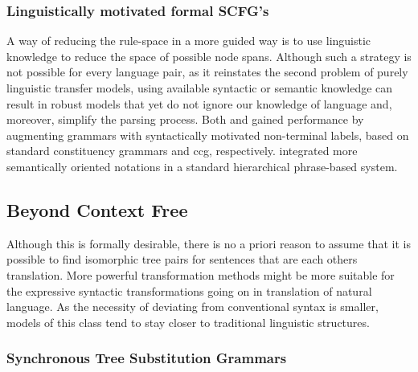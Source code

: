 \documentclass{report}
\theoremstyle{definition}
\theoremstyle{plain}
\begin{document}

\subsubsection{Linguistically motivated formal SCFG's}

A way of reducing the rule-space in a more guided way is to use linguistic knowledge to reduce the space of possible node spans. Although such a strategy is not possible for every language pair, as it reinstates the second problem of purely linguistic transfer models, using available syntactic or semantic knowledge can result in robust models that yet do not ignore our knowledge of language and, moreover, simplify the parsing process. Both \cite{zollmann2006syntax} and \cite{almaghout2010ccg} gained performance by augmenting grammars with syntactically motivated non-terminal labels, based on standard constituency grammars and ccg, respectively. \cite{li2013modeling} integrated more semantically oriented notations in a standard hierarchical phrase-based system.


\subsection{Beyond Context Free}

Although this is formally desirable, there is no a priori reason to assume that it is possible to find isomorphic tree pairs for sentences that are each others translation. More powerful transformation methods might be more suitable for the expressive syntactic transformations going on in translation of natural language. As the necessity of deviating from conventional syntax is smaller, models of this class tend to stay closer to traditional linguistic structures.

\subsubsection{Synchronous Tree Substitution Grammars}
\end{document}
